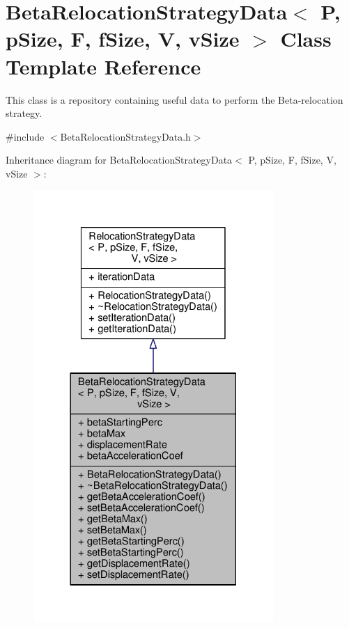 \hypertarget{structBetaRelocationStrategyData}{}\section{Beta\+Relocation\+Strategy\+Data$<$ P, p\+Size, F, f\+Size, V, v\+Size $>$ Class Template Reference}
\label{structBetaRelocationStrategyData}


This class is a repository containing useful data to perform the Beta-\/relocation strategy.  




{\ttfamily \#include $<$Beta\+Relocation\+Strategy\+Data.\+h$>$}



Inheritance diagram for Beta\+Relocation\+Strategy\+Data$<$ P, p\+Size, F, f\+Size, V, v\+Size $>$\+:\nopagebreak
\begin{figure}[H]
\begin{center}
\leavevmode
\includegraphics[width=258pt]{structBetaRelocationStrategyData__inherit__graph}
\end{center}
\end{figure}


